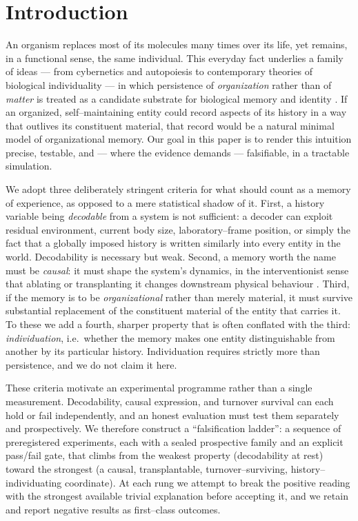 \documentclass[11pt]{article}
\begin{document}
\section{Introduction}
An organism replaces most of its molecules many times over its life, yet remains, in a functional sense, the same
individual. This everyday fact underlies a family of ideas --- from cybernetics and autopoiesis to contemporary
theories of biological individuality --- in which persistence of \emph{organization} rather than of \emph{matter}
is treated as a candidate substrate for biological memory and identity \citep{ashby1952,maturana1980,godfreysmith2009}.
If an organized, self--maintaining entity could record aspects of its history in a way that outlives its
constituent material, that record would be a natural minimal model of organizational memory. Our goal in this
paper is to render this intuition precise, testable, and --- where the evidence demands --- falsifiable, in a
tractable simulation.

We adopt three deliberately stringent criteria for what should count as a memory of experience, as opposed to a
mere statistical shadow of it. First, a history variable being \emph{decodable} from a system is not sufficient: a
decoder can exploit residual environment, current body size, laboratory--frame position, or simply the fact that a
globally imposed history is written similarly into every entity in the world. Decodability is necessary but weak.
Second, a memory worth the name must be \emph{causal}: it must shape the system's dynamics, in the interventionist
sense that ablating or transplanting it changes downstream physical behaviour \citep{pearl2009,rubin1974,pearl1995}.
Third, if the memory is to be \emph{organizational} rather than merely material, it must survive substantial
replacement of the constituent material of the entity that carries it. To these we add a fourth, sharper property
that is often conflated with the third: \emph{individuation}, i.e.\ whether the memory makes one entity
distinguishable from another by its particular history. Individuation requires strictly more than persistence, and
we do not claim it here.

These criteria motivate an experimental programme rather than a single measurement. Decodability, causal
expression, and turnover survival can each hold or fail independently, and an honest evaluation must test them
separately and prospectively. We therefore construct a ``falsification ladder'': a sequence of preregistered
experiments, each with a sealed prospective family and an explicit pass/fail gate, that climbs from the weakest
property (decodability at rest) toward the strongest (a causal, transplantable, turnover--surviving,
history--individuating coordinate). At each rung we attempt to break the positive reading with the strongest
available trivial explanation before accepting it, and we retain and report negative results as first--class
outcomes.
\end{document}
